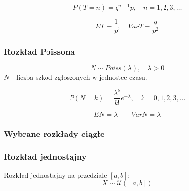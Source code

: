 \documentclass[../Matematyka.tex]{subfiles}
\begin{document}
\[P(T=n) = q^{n-1}p, \quad n = 1,2,3,\ldots\]

\[ET = \frac{1}{p}, \quad VarT = \frac{q}{p^2}\]

\subsubsection*{Rozkład Poissona}
\[N \sim Poiss(\lambda), \quad \lambda > 0\]
\(N\) - liczba szkód zgłoszonych w jednostce czasu.

\[P(N = k) = \frac{\lambda^k}{k!}e^{-\lambda}, \quad k = 0,1,2,3,\ldots\]

\[EN = \lambda \qquad VarN = \lambda\]

\newpage
\subsubsection{Wybrane rozkłady ciągłe}
\subsubsection*{Rozkład jednostajny}
Rozkład jednostajny na przedziale \([a, b]\):
\[X \sim \mathcal{U}([a,b])\]
\end{document}
